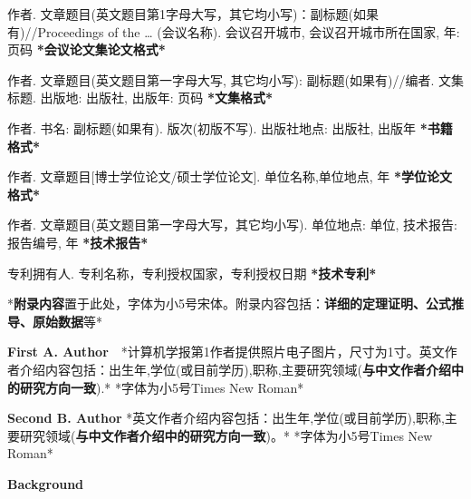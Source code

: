 \documentclass[10.5pt,compsoc]{CjC}
\theoremstyle{mystyle}
\begin{document}
\begin{CJK*}{UTF8}{song}
\begin{thebibliography}{99}
作者.
文章题目(英文题目第1字母大写，其它均小写)：副标题(如果有)//Proceedings of
the {\ldots} (会议名称). 会议召开城市, 会议召开城市所在国家, 年: 页码
\textbf{*会议论文集论文格式*}

作者. 文章题目(英文题目第一字母大写, 其它均小写):
副标题(如果有)//编者. 文集标题. 出版地: 出版社, 出版年: 页码
\textbf{*文集格式*}

作者. 书名: 副标题(如果有). 版次(初版不写). 出版社地点: 出版社,
出版年 \textbf{*书籍格式*}

作者. 文章题目[博士学位论文/硕士学位论文]. 单位名称,单位地点, 年
\textbf{*学位论文格式*}

作者. 文章题目(英文题目第一字母大写，其它均小写). 单位地点: 单位,
技术报告: 报告编号, 年 \textbf{*技术报告*}

专利拥有人. 专利名称，专利授权国家，专利授权日期
\textbf{*技术专利*}
  \end{thebibliography}



{\setlength\parindent{2em}
*\textbf{附录内容}置于此处，字体为小5号宋体。附录内容包括：\textbf{详细的定理证明、公式推导、原始数据}等*}


\begin{biography}
\noindent
\textbf{First A. Author}\ \ *计算机学报第1作者提供照片电子图片，尺寸为1寸。英文作者介绍内容包括：出生年,学位(或目前学历),职称,主要研究领域(\textbf{与中文作者介绍中的研究方向一致}).*
*字体为小5号Times New Roman*

\end{biography}

\begin{biography}
\noindent
\textbf{Second B. Author} *英文作者介绍内容包括：出生年,学位(或目前学历),职称,主要研究领域(\textbf{与中文作者介绍中的研究方向一致})。*
*字体为小5号Times New Roman*
\end{biography}

\noindent \textbf{Background}


\end{CJK*}
\end{document}
